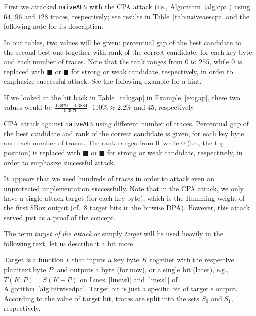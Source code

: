 	First we attacked {\tt naiveAES} with the CPA attack (i.e., Algorithm~\ref{alg:cpa}) using $64$, $96$ and $128$ traces, respectively; see results in Table~\ref{tab:naiveaescpa} and the following note for its description.
	
	\begin{note}
	\label{note:tabvals}
		In our tables, two values will be given: percentual gap of the best candidate to the second best one together with rank of the correct candidate, for each key byte and each number of traces. Note that the rank ranges from $0$ to $255$, while $0$ is replaced with $\blacksquare$ or {\weak$\blacksquare$} for strong or weak candidate, respectively, in order to emphasize successful attack. See the following example for a hint.
	\end{note}
	
	\begin{example}
	\label{ex:gaprank}
		If we looked at the  bit back in Table~\ref{tab:gap} in Example~\ref{ex:gap}, these two values would be $\frac{0.3970-0.3884}{0.3970}\cdot100\%\approx2.2\%$ and $45$, respectively.
	\end{example}
	
	\begin{table}[h]
		\begin{center}
		
		\end{center}
	\caption{CPA attack against {\tt naiveAES} using different number of traces. Percentual gap of the best candidate and rank of the correct candidate is given, for each key byte and each number of traces. The rank ranges from $0$, while $0$ (i.e., the top position) is replaced with $\blacksquare$ or {\weak$\blacksquare$} for strong or weak candidate, respectively, in order to emphasize successful attack.}
	\label{tab:naiveaescpa}
	\end{table}
	
	It appears that we need hundreds of traces in order to attack even an unprotected implementation successfully. Note that in the CPA attack, we only have a single attack target (for each key byte), which is the Hamming weight of the first SBox output (cf.\ $8$ target bits in the bitwise DPA). However, this attack served just as a proof of the concept.
	
	\begin{note}
	\label{note:target}
		The term {\em target of the attack} or simply {\em target} will be used heavily in the following text, let us describe it a bit more.
		
		Target is a function $T$ that inputs a key byte $K$ together with the respective plaintext byte $P$, and outputs a byte (for now), or a single bit (later), e.g., $T(K,P) = S(K+P)$ on Lines~\ref{line:s0} and \ref{line:s1} of Algorithm~\ref{alg:bitwisedpa}. Target bit is just a specific bit of target's output. According to the value of target bit, traces are split into the sets $S_0$ and $S_1$, respectively.
	\end{note}

